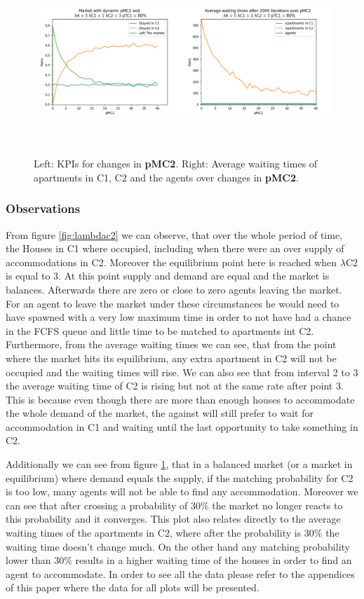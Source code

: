 \begin{figure}
    \centering
    \includegraphics[width=1\linewidth, height = 7cm]{figures/pMC2.png}
    \caption{Left: KPIs for changes in \textbf{pMC2}. Right: Average waiting times of apartments in C1, C2 and the agents over changes in \textbf{pMC2}.}
    \label{fig:pMC2}
\end{figure}

\subsubsection{Observations}

From figure \ref{fig:lambdac2} we can observe, that over the whole period of time, the Houses in C1 where occupied, including when there were an over supply of accommodations in C2. Moreover the equilibrium point here is reached when $\lambda$C2 is equal to 3. At this point supply and demand are equal and the market is balances. Afterwards there are zero or close to zero agents leaving the market. For an agent to leave the market under these circumstances he would need to have spawned with a very low maximum time in order to not have had a chance in the FCFS queue and little time to be matched to apartments int C2. Furthermore, from the average waiting times we can see, that from the point where the market hits its equilibrium, any extra apartment in C2 will not be occupied and the waiting times will rise. We can also see that from  interval 2 to 3 the average waiting time of C2 is rising but not at the same rate after point 3. This is because even though there are more than enough houses to accommodate the whole demand of the market, the against will still prefer to wait for accommodation in C1 and waiting until the last opportunity to take something in C2.

Additionally we can see from figure \ref{fig:pMC2}, that in a balanced market (or a market in equilibrium) where demand equals the supply, if the matching probability for C2 is too low, many agents will not be able to find any accommodation. Moreover we can see that after crossing a probability of 30\% the market no longer reacts to this probability and it converges. This plot also relates directly to the average waiting times of the apartments in C2, where after the probability is 30\% the waiting time doesn't change much. On the other hand any matching probability lower than 30\% results in a higher waiting time of the houses in order to find an agent to accommodate. In order to see all the data please refer to the appendices of this paper where the data for all plots will be presented.

